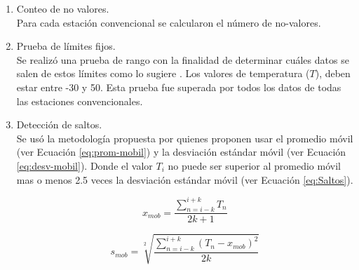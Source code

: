 
%		
%
\begin{enumerate}


	\item Conteo de no valores.\\
	Para cada estación convencional se calcularon el número de no-valores.
    
    \item Prueba de límites fijos.\\
	Se realizó una prueba de rango con la finalidad de determinar cuáles datos se salen de estos límites como lo sugiere \citet{estevez2011}. Los valores de temperatura ($T$), deben estar entre -30 y 50\celc. Esta prueba fue superada por todos los datos de todas las estaciones convencionales.


	\item Detección de saltos.\\
	Se usó la metodología propuesta por \citet{vickers1997} quienes proponen usar el promedio móvil (ver Ecuación \ref{eq:prom-mobil}) y la desviación estándar móvil (ver Ecuación \ref{eq:desv-mobil}). Donde el valor $T_i$ no puede ser superior al promedio móvil mas o menos 2.5 veces la desviación estándar móvil (ver Ecuación \ref{eq:Saltos}).

	
	
\begin{equation}\label{eq:prom-mobil}
    x_{mob} = \frac{\sum\limits_{n=i-k}^{i+k} T_{n}}{2k + 1}
\end{equation}

\begin{equation}\label{eq:desv-mobil}
s_{mob} = \sqrt[2]{\frac{\sum\limits_{n=i-k}^{i+k} (T_{n} - x_{mob})^2}{2k}} 
\end{equation}
 

\end{enumerate}
